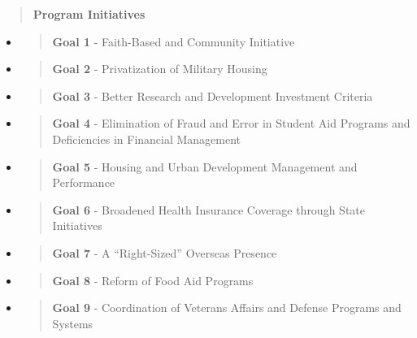 \begin{quote}
\textbf{Program Initiatives}
\end{quote}

\begin{itemize}
\item
  \begin{quote}
  \textbf{Goal 1} - Faith-Based and Community Initiative
  \end{quote}
\item
  \begin{quote}
  \textbf{Goal 2} - Privatization of Military Housing
  \end{quote}
\item
  \begin{quote}
  \textbf{Goal 3} - Better Research and Development Investment Criteria
  \end{quote}
\item
  \begin{quote}
  \textbf{Goal 4} - Elimination of Fraud and Error in Student Aid
  Programs and Deficiencies in Financial Management
  \end{quote}
\item
  \begin{quote}
  \textbf{Goal 5} - Housing and Urban Development Management and
  Performance
  \end{quote}
\item
  \begin{quote}
  \textbf{Goal 6} - Broadened Health Insurance Coverage through State
  Initiatives
  \end{quote}
\item
  \begin{quote}
  \textbf{Goal 7} - A ``Right-Sized'' Overseas Presence
  \end{quote}
\item
  \begin{quote}
  \textbf{Goal 8} - Reform of Food Aid Programs
  \end{quote}
\item
  \begin{quote}
  \textbf{Goal 9} - Coordination of Veterans Affairs and Defense
  Programs and Systems
  \end{quote}
\end{itemize}
